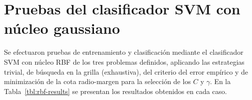 %
%
%
\section{Pruebas del clasificador SVM con núcleo gaussiano}
%
Se efectuaron pruebas de entrenamiento y clasificación mediante el
clasificador SVM con núcleo RBF de los tres problemas definidos,
aplicando las estrategias trivial, de búsqueda en la grilla
(exhaustiva), del criterio del error empírico y de minimización de la
cota radio-margen para la selección de los  $C$ y $\gamma$.
En la Tabla~\ref{tbl:rbf-results} se presentan los resultados
obtenidos en cada caso.
